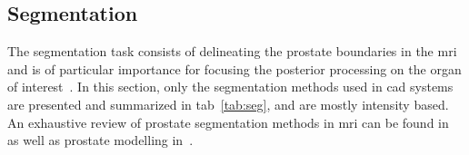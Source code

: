 \subsection{Segmentation} \label{subsec:segmentation}

The segmentation task consists of delineating the prostate boundaries in the \ac{mri} and is of particular importance for focusing the posterior processing on the organ of interest~\cite{Ghose2012}. In this section, only the segmentation methods used in \ac{cad} systems are presented and summarized in \ac{tab}~\ref{tab:seg}, and are mostly intensity based. An exhaustive review of prostate segmentation methods in \ac{mri} can be found in~\cite{Ghose2012} as well as prostate modelling in~\cite{Chilali2014}.

